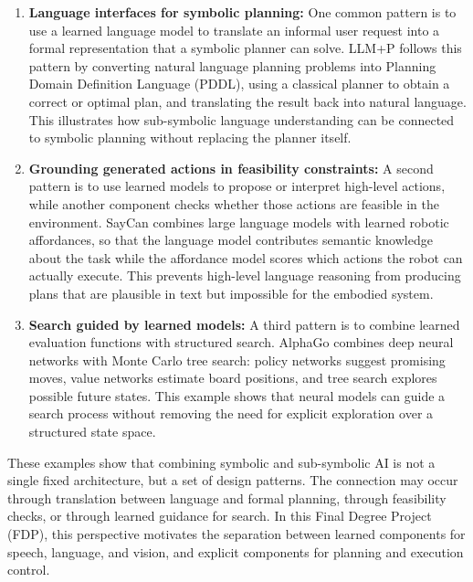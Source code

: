 \begin{enumerate}
    \item \textbf{Language interfaces for symbolic planning:} One common pattern is to use a learned language model to translate an informal user request into a formal representation that a symbolic planner can solve. LLM+P \cite{Liu2023LLMP} follows this pattern by converting natural language planning problems into Planning Domain Definition Language (PDDL), using a classical planner to obtain a correct or optimal plan, and translating the result back into natural language. This illustrates how sub-symbolic language understanding can be connected to symbolic planning without replacing the planner itself.

    \item \textbf{Grounding generated actions in feasibility constraints:} A second pattern is to use learned models to propose or interpret high-level actions, while another component checks whether those actions are feasible in the environment. SayCan \cite{Ahn2022SayCan} combines large language models with learned robotic affordances, so that the language model contributes semantic knowledge about the task while the affordance model scores which actions the robot can actually execute. This prevents high-level language reasoning from producing plans that are plausible in text but impossible for the embodied system.

    \item \textbf{Search guided by learned models:} A third pattern is to combine learned evaluation functions with structured search. AlphaGo \cite{Silver2016AlphaGo} combines deep neural networks with Monte Carlo tree search: policy networks suggest promising moves, value networks estimate board positions, and tree search explores possible future states. This example shows that neural models can guide a search process without removing the need for explicit exploration over a structured state space.

\end{enumerate}

These examples show that combining symbolic and sub-symbolic AI is not a single fixed architecture, but a set of design patterns. The connection may occur through translation between language and formal planning, through feasibility checks, or through learned guidance for search. In this Final Degree Project (FDP), this perspective motivates the separation between learned components for speech, language, and vision, and explicit components for planning and execution control.

